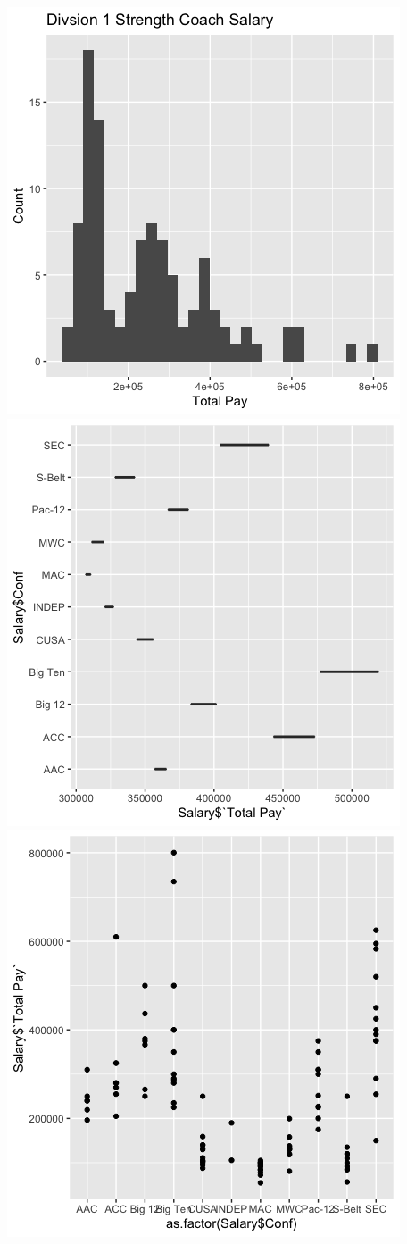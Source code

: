 \documentclass{article}
\begin{document}
\includegraphics[]{vis 1.png}
\includegraphics[]{Vis 2.png}
\includegraphics[]{Vis 3.png}
\end{document}
